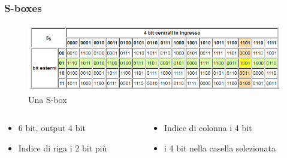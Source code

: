 		\begin{frame}
			\frametitle{S-boxes}	
			\begin{center}
				\begin{figure}
					\includegraphics[scale=0.5]{img/desbox}
					\caption{Una S-box}
				\end{figure}
			\end{center}
			\begin{columns}
				\begin{column}{0.5\textwidth}
					\begin{itemize}
						\item {} 6 bit, output 4 bit
						\item Indice di riga i 2 bit più 
					\end{itemize}
				\end{column}
				\begin{column}{0.5\textwidth}
					\begin{itemize}
						\item Indice di colonna i 4 bit 
						\item {} i 4 bit nella casella selezionata
					\end{itemize}
				\end{column}
			\end{columns}
		\end{frame}
	
